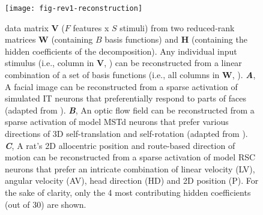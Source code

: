 \begin{figure}[!h]
	\centering
	\texttt{[image: fig-rev1-reconstruction]}
    \caption{ data matrix \textbf{V}
             ($F$ features x $S$ stimuli)
             from two reduced-rank matrices \textbf{W}
             (containing $B$ basis functions) and \textbf{H}
             (containing the hidden coefficients of the decomposition).
             Any individual input stimulus (i.e., column in \textbf{V}, )
             can be reconstructed from a linear combination
             of a set of basis functions (i.e., all columns in \textbf{W}, 
             ).
         \textbf{\emph{A}},
             A facial image can be reconstructed from a sparse activation
             of simulated \acs{IT} neurons that
             preferentially respond to parts of faces
             (adapted from \cite{LeeSeung1999}).
         \textbf{\emph{B}},
             An optic flow field can be reconstructed from a sparse
             activation of model \acs{MSTd} neurons that prefer various
             directions of 3D self-translation and self-rotation
             (adapted from \cite{Beyeler2016}).
         \textbf{\emph{C}},
             A rat's 2D allocentric position and route-based direction of
             motion can be reconstructed from a sparse activation of
             model \acs{RSC} neurons that prefer an intricate combination of
             linear velocity (LV), angular velocity (AV), head direction (HD)
             and 2D position (P).
             For the sake of clarity, only the 4 most contributing hidden
             coefficients (out of 30) are shown.}
	\label{fig:NMF|reconstruction}
\end{figure}



